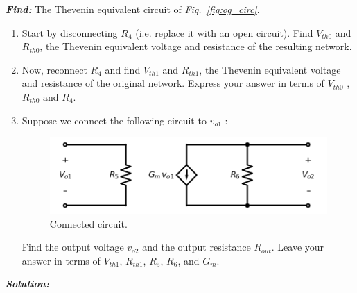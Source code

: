\documentclass[12pt, fleqn]{article}
\begin{document}
\noindent
\textbf{\emph{Find: }} The Thevenin equivalent circuit of \emph{Fig.~\ref{fig:og_circ}}.

\begin{enumerate}[label=(\alph*)]
    \item{Start by disconnecting $R_4$ (i.e. replace it with an open circuit). Find $V_{th0}$ and $R_{th0}$, the Thevenin equivalent voltage and resistance of the resulting network.}
    \item{Now, reconnect $R_4$ and find $V_{th1}$ and $R_{th1}$, the Thevenin equivalent voltage and resistance of the original network.  Express your answer in terms of $V_{th0}$ , $R_{th0}$ and $R_4$.}
    \item
        {
        Suppose we connect the following circuit to $v_{o1}$ :
        \begin{figure}[H]
        \centering
        \includegraphics[scale=0.85]{p1c.png}
        \caption{Connected circuit.}
        \label{fig:add_circ}
        \end{figure}
        Find the output voltage $v_{o2}$ and the output resistance $R_{out}$.  Leave your answer in terms of $V_{th1}$, $R_{th1}$, $R_5$, $R_6$, and $G_m$.
        }
\end{enumerate}

\newpage\noindent
\textbf{\emph{Solution: }}
\end{document}
